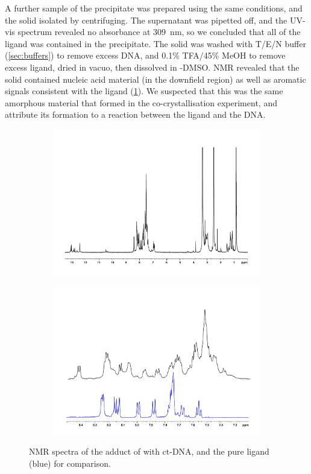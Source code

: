 \begin{refsection}
A further sample of the precipitate was prepared using the same conditions, and the solid isolated by centrifuging.
The supernatant was pipetted off, and the UV-vis spectrum revealed no absorbance at 309~nm, so we concluded that all of the ligand was contained in the precipitate.
The solid was washed with T/E/N buffer (\cref{sec:buffers}) to remove excess DNA, and 0.1\% TFA/45\% MeOH to remove excess ligand, dried in vacuo, then dissolved in -DMSO.\@
{}NMR revealed that the solid contained nucleic acid material (in the downfield region) as well as aromatic signals consistent with the ligand (\cref{fig:ebshoe-dna-adduct}).
We suspected that this was the same amorphous material that formed in the co-crystallisation experiment, and attribute its formation to a reaction between the ligand and the DNA.\@

\begin{figure}
    \centering
    \begin{subfigure}{\linewidth}
        \centering
        \includegraphics[width=0.8\linewidth]{Figures/ebshoe-dna-adduct-full.pdf}
        \caption{}
    \end{subfigure}
    \begin{subfigure}{\linewidth}
        \centering
        \includegraphics[width=0.8\linewidth]{Figures/ebshoe-dna-adduct-aromatic.pdf}
        \caption{}
    \end{subfigure}
    \caption{ NMR spectra of the adduct of  with ct-DNA, and the pure ligand (blue) for comparison.}\label{fig:ebshoe-dna-adduct}


\end{figure}
\end{refsection}
